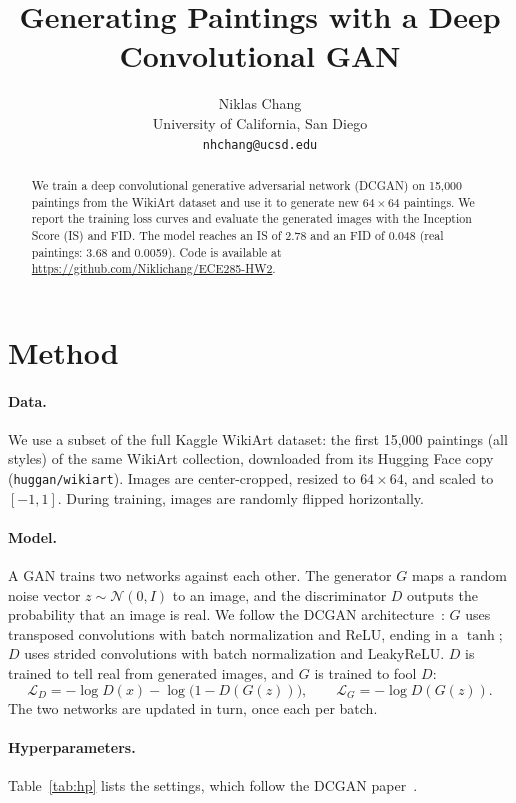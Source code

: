 \documentclass{article}
\title{Generating Paintings with a Deep Convolutional GAN}
\author{Niklas Chang \\ University of California, San Diego \\ \texttt{nhchang@ucsd.edu}}
\begin{document}
\maketitle

\begin{abstract}
We train a deep convolutional generative adversarial network (DCGAN) on 15,000 paintings
from the WikiArt dataset and use it to generate new $64\times64$ paintings. We report the training
loss curves and evaluate the generated images with the Inception Score (IS) and FID.
The model reaches an IS of 2.78 and an FID of 0.048 (real paintings: 3.68 and 0.0059). Code is available at \url{https://github.com/Niklichang/ECE285-HW2}.
\end{abstract}

\section{Method}
\paragraph{Data.} We use a subset of the full Kaggle WikiArt dataset: the first 15,000 paintings (all styles) of the same WikiArt collection, downloaded from its
Hugging Face copy (\texttt{huggan/wikiart}). Images are center-cropped, resized to $64\times64$, and scaled to $[-1,1]$. During training, images are
randomly flipped horizontally.

\paragraph{Model.} A GAN trains two networks against each other. The generator $G$ maps a random
noise vector $z\sim\mathcal N(0,I)$ to an image, and the discriminator $D$ outputs the probability that
an image is real. We follow the DCGAN architecture~\cite{radford2016dcgan}: $G$ uses transposed convolutions with batch
normalization and ReLU, ending in a $\tanh$; $D$ uses strided convolutions with batch normalization and
LeakyReLU. $D$ is trained to tell real from generated images, and $G$ is trained to fool $D$:
\begin{equation}
\mathcal L_D = -\log D(x) - \log\big(1-D(G(z))\big), \qquad \mathcal L_G = -\log D(G(z)).
\end{equation}
The two networks are updated in turn, once each per batch.

\paragraph{Hyperparameters.} Table~\ref{tab:hp} lists the settings, which follow the DCGAN paper~\cite{radford2016dcgan}.
\end{document}
